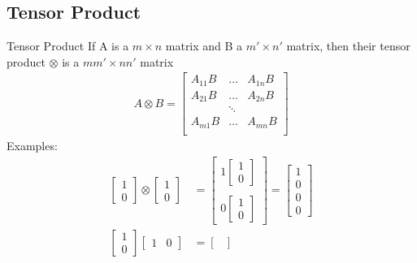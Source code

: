 \documentclass{beamer}
\begin{document}
\subsection{Tensor Product}
\begin{frame}{Tensor Product}
  {\tiny
    If A is a $m \times n$ matrix and B a $m' \times n'$ matrix, then their tensor product $\otimes$ is a $mm' \times nn'$ matrix
    \begin{align*}
      A \otimes B = \begin{bmatrix}
                      A_{11}B & \dots & A_{1n}B \\
                      A_{21}B & \dots & A_{2n}B \\
                              & \ddots &        \\
                      A_{m1}B & \dots & A_{mn}B \\
                    \end{bmatrix}
    \end{align*}
    Examples:
    \begin{align*}
      \begin{bmatrix} 1 \\ 0 \end{bmatrix} \otimes \begin{bmatrix} 1 \\ 0 \end{bmatrix} &=
          \begin{bmatrix}
            1 \begin{bmatrix} 1 \\ 0 \end{bmatrix} \\
            \\
            0 \begin{bmatrix} 1 \\ 0 \end{bmatrix}
          \end{bmatrix}
          = \begin{bmatrix} 1 \\ 0 \\ 0 \\ 0 \end{bmatrix} \\
      \begin{bmatrix} 1 \\ 0 \end{bmatrix} \begin{bmatrix} 1 & 0 \end{bmatrix} &= \begin{bmatrix}

\end{bmatrix}
\end{align*}}
\end{frame}
\end{document}
